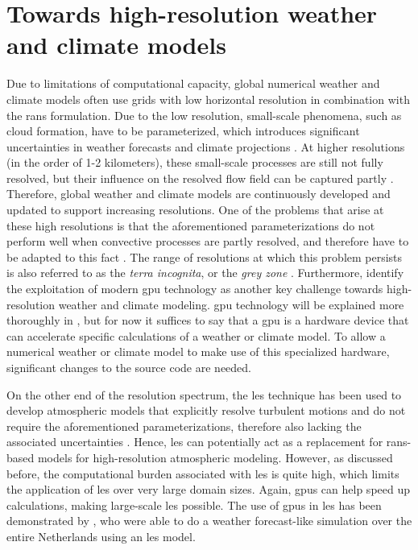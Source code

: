 \section{Towards high-resolution weather and climate models}
Due to limitations of computational capacity, global numerical weather and climate models often use grids with low horizontal resolution in combination with the \acrshort{rans} formulation. Due to the low resolution, small-scale phenomena, such as cloud formation, have to be parameterized, which introduces significant uncertainties in weather forecasts and climate projections \citep{slingoUncertaintyWeatherClimate2011}. At higher resolutions (in the order of 1-2 kilometers), these small-scale processes are still not fully resolved, but their influence on the resolved flow field can be captured partly \citep{scharKilometerScaleClimateModels2020}. Therefore, global weather and climate models are continuously developed and updated to support increasing resolutions. One of the problems that arise at these high resolutions is that the aforementioned parameterizations do not perform well when convective processes are partly resolved, and therefore have to be adapted to this fact \citep{wyngaardNumericalModelingTerra2004}. The range of resolutions at which this problem persists is also referred to as the \emph{terra incognita}, or the \emph{grey zone} \citep{schalkwijkWeatherForecastingUsing2015,wyngaardNumericalModelingTerra2004}. Furthermore, \citet{scharKilometerScaleClimateModels2020} identify the exploitation of modern \acrlong{gpu} technology as another key challenge towards high-resolution weather and climate modeling. \acrshort{gpu} technology will be explained more thoroughly in , but for now it suffices to say that a \acrshort{gpu} is a hardware device that can accelerate specific calculations of a weather or climate model. To allow a numerical weather or climate model to make use of this specialized hardware, significant changes to the source code are needed.

On the other end of the resolution spectrum, the \acrshort{les} technique has been used to develop atmospheric models that explicitly resolve turbulent motions and do not require the aforementioned parameterizations, therefore also lacking the associated uncertainties \citep{schalkwijkWeatherForecastingUsing2015}. Hence, \acrshort{les} can potentially act as a replacement for \acrshort{rans}-based models for high-resolution atmospheric modeling. However, as discussed before, the computational burden associated with \acrshort{les} is quite high, which limits the application of \acrshort{les} over very large domain sizes. Again, \acrshort{gpu}s can help speed up calculations, making large-scale \acrshort{les} possible. The use of \acrshort{gpu}s in \acrshort{les} has been demonstrated by \citet{schalkwijkWeatherForecastingUsing2015}, who were able to do a weather forecast-like simulation over the entire Netherlands using an \acrshort{les} model.

